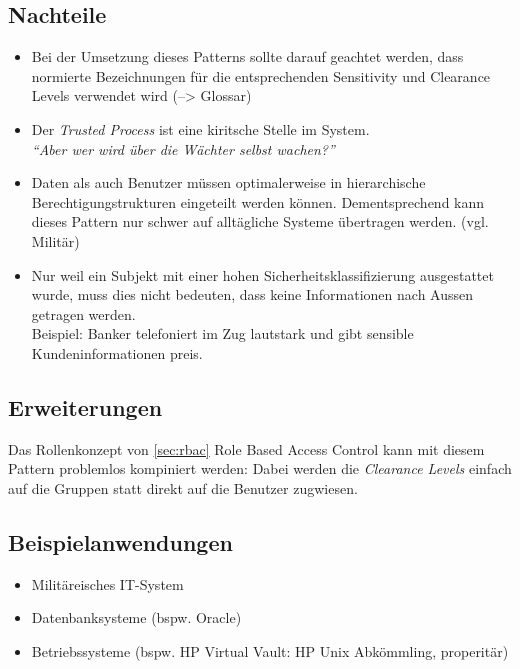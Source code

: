 \subsection*{Nachteile}
\begin{itemize}
	\item Bei der Umsetzung dieses Patterns sollte darauf geachtet werden, dass normierte Bezeichnungen für die entsprechenden Sensitivity und Clearance Levels verwendet wird (--> Glossar)
	\item Der \emph{Trusted Process} ist eine kiritsche Stelle im System.\\
	\emph{``Aber wer wird über die Wächter selbst wachen?''}
	\item Daten als auch Benutzer müssen optimalerweise in hierarchische Berechtigungstrukturen eingeteilt werden können.
	Dementsprechend kann dieses Pattern nur schwer auf alltägliche Systeme übertragen werden. (vgl. Militär)
	\item Nur weil ein Subjekt mit einer hohen Sicherheitsklassifizierung ausgestattet wurde, muss dies nicht bedeuten, dass keine Informationen nach Aussen getragen werden.\\Beispiel: Banker telefoniert im Zug lautstark und gibt sensible Kundeninformationen preis.
\end{itemize}

\subsection*{Erweiterungen}
Das Rollenkonzept von \ref{sec:rbac} Role Based Access Control kann mit diesem Pattern problemlos kompiniert werden: Dabei werden die \emph{Clearance Levels} einfach auf die Gruppen statt direkt auf die Benutzer zugwiesen.

\subsection*{Beispielanwendungen}
\begin{itemize}
	\item Militäreisches IT-System
	\item Datenbanksysteme (bspw. Oracle)
	\item Betriebssysteme (bspw. HP Virtual Vault: HP Unix Abkömmling, properitär)
\end{itemize}